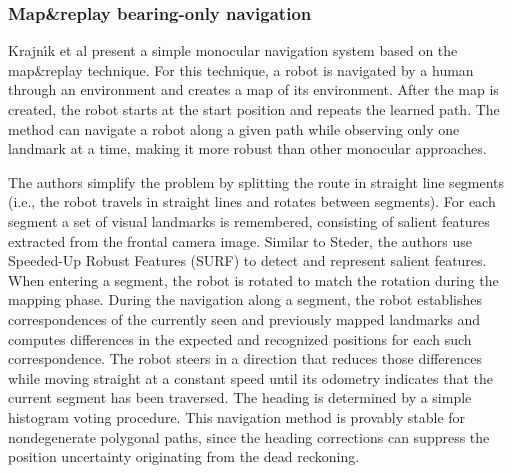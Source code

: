 \subsubsection{Map\&replay bearing-only navigation}
Krajn{\'\i}k et al \cite{krajník2010simple,faiglsurveillance,krajník2011ar} present a simple monocular navigation system based on the map\&replay technique.
For this technique, a robot is navigated by a human through an environment and creates a map of its environment.
After the map is created, the robot starts at the start position and repeats the learned path.
The method can navigate a robot along a given path while observing only one landmark at a time, making it more robust than other monocular approaches.

The authors simplify the problem by splitting the route in straight line segments (i.e., the robot travels in straight lines and rotates between segments).
For each segment a set of visual landmarks is remembered, consisting of salient features extracted from the frontal camera image.
Similar to Steder, the authors use Speeded-Up Robust Features (SURF) to detect and represent salient features.
When entering a segment, the robot is rotated to match the rotation during the mapping phase.
During the navigation along a segment, the robot establishes correspondences of the currently seen and previously mapped landmarks and computes differences in the expected and recognized positions for each such correspondence.
The robot steers in a direction that reduces those differences while moving straight at a constant speed until its odometry indicates that the current segment has been traversed.
The heading is determined by a simple histogram voting procedure.
This navigation method is provably stable for nondegenerate polygonal paths, since the heading corrections can suppress the position uncertainty originating from the dead reckoning.
